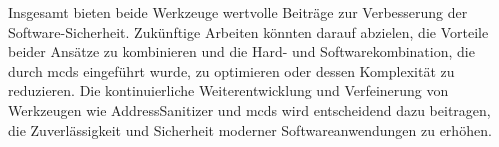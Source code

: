 \documentclass[acmtog,nonacm]{acmart}
\begin{document}
Insgesamt bieten beide Werkzeuge wertvolle Beiträge zur Verbesserung der
Software-Sicherheit. Zukünftige Arbeiten könnten darauf abzielen, die Vorteile
beider Ansätze zu kombinieren und die Hard- und Softwarekombination, die durch
mcds eingeführt wurde, zu optimieren oder dessen Komplexität zu reduzieren. Die
kontinuierliche Weiterentwicklung und Verfeinerung von Werkzeugen wie AddressSanitizer und
mcds wird entscheidend dazu beitragen, die Zuverlässigkeit und Sicherheit
moderner Softwareanwendungen zu erhöhen.



\end{document}
